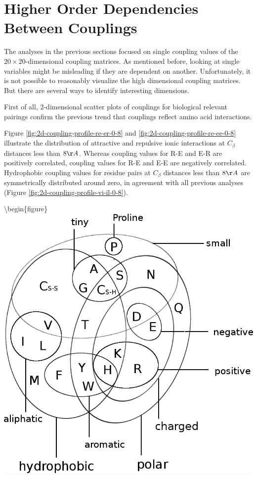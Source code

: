 \documentclass[12pt,a4paper,twoside]{book}
\newcommand{\Cb}{C_\beta}
\theoremstyle{definition}
\theoremstyle{definition}
\theoremstyle{remark}
\begin{document}
\section{Higher Order Dependencies Between
Couplings}\label{higher-order-dependencies-between-couplings}

The analyses in the previous sections focused on single coupling values
of the \(20 \times 20\)-dimensional coupling matrices. As mentioned
before, looking at single variables might be misleading if they are
dependent on another. Unfortunately, it is not possible to reasonably
visualize the high dimensional coupling matrices. But there are several
ways to identify interesting dimensions.

First of all, 2-dimensional scatter plots of couplings for biological
relevant pairings confirm the previous trend that couplings reflect
amino acid interactions.

Figure \ref{fig:2d-coupling-profile-re-er-0-8} and
\ref{fig:2d-coupling-profile-re-ee-0-8} illustrate the distribution of
attractive and repulsive ionic interactions at \(\Cb\) distances less
than \(8\AA\). Whereas coupling values for R-E and E-R are positively
correlated, coupling values for R-E and E-E are negatively correlated.
Hydrophobic coupling values for residue pairs at \(\Cb\) distances less
than \(8\AA\) are symmetrically distributed around zero, in agreement
with all previous analyses (Figure
\ref{fig:2d-coupling-profile-vi-il-0-8}).








\textbackslash{}begin\{figure\}
\includegraphics[width=0.75\linewidth]{img/amino_acid_physico_chemical_properties_venn_diagramm}
\end{document}
